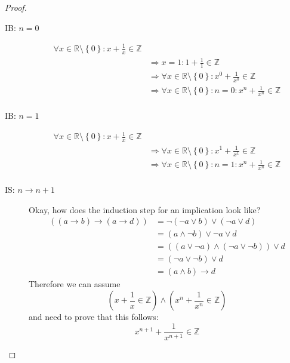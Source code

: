 \documentclass[a4paper]{article}
\theoremstyle{definition}
\newcommand\set[1]{\left\{#1\right\}}
\begin{document}
\begin{proof}
  \begin{description}
    \item[IB: $n = 0$]
      \begin{align*}
        \forall x \in \mathbb{R} \setminus \set{0}: x + \frac1x \in \mathbb{Z} & \\
        &\Rightarrow x = 1: 1 + \frac11 \in \mathbb Z \\
        &\Rightarrow \forall x \in \mathbb{R} \setminus \set{0}: x^0 + \frac1{x^0} \in \mathbb Z \\
        &\Rightarrow \forall x \in \mathbb{R} \setminus \set{0}: n = 0: x^n + \frac1{x^n} \in \mathbb Z \\
      \end{align*}
    \item[IB: $n = 1$]
      \begin{align*}
        \forall x \in \mathbb{R} \setminus \set{0}: x + \frac1x \in \mathbb{Z} & \\
        &\Rightarrow \forall x \in \mathbb{R} \setminus \set{0}: x^1 + \frac1{x^1} \in \mathbb Z \\
        &\Rightarrow \forall x \in \mathbb{R} \setminus \set{0}: n = 1: x^n + \frac1{x^n} \in \mathbb Z \\
      \end{align*}
    \item[IS: $n \rightarrow n + 1$]
      Okay, how does the induction step for an implication look like?
      \begin{align*}
        \left((a \rightarrow b) \rightarrow (a \rightarrow d)\right)
          &= \neg (\neg a \lor b) \lor (\neg a \lor d) \\
          &= (a \land \neg b) \lor \neg a \lor d \\
          &= ((a \lor \neg a) \land (\neg a \lor \neg b)) \lor d \\
          &= (\neg a \lor \neg b) \lor d \\
          &= (a \land b) \rightarrow d
      \end{align*}
      Therefore we can assume
      \[ \left(x + \frac1x \in \mathbb Z\right) \land \left(x^n + \frac1{x^n} \in \mathbb Z\right) \]
      and need to prove that this follows:
      \[ x^{n+1} + \frac1{x^{n+1}} \in \mathbb Z \]


\end{description}
\end{proof}
\end{document}
